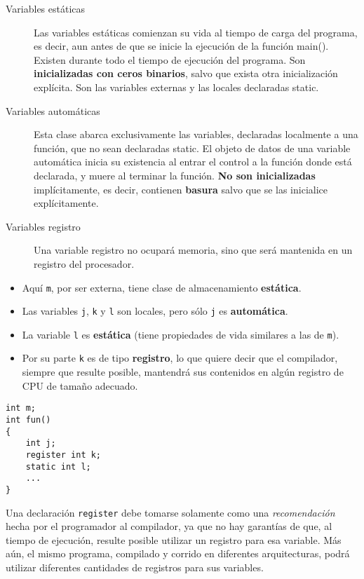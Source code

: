\begin{description}
	\item[Variables estáticas] Las variables estáticas comienzan su vida al tiempo de carga del programa, es decir, aun antes de que
se inicie la ejecución de la función main(). Existen durante todo el tiempo de ejecución del programa.
Son \textbf{inicializadas con ceros binarios}, salvo que exista otra inicialización explícita. Son las variables
externas y las locales declaradas static.
 \item [Variables automáticas] Esta clase abarca exclusivamente las variables, declaradas localmente a una función, que no sean
declaradas static. El objeto de datos de una variable automática inicia su existencia al entrar el control a la función donde
está declarada, y muere al terminar la función. \textbf{No son inicializadas} implícitamente, es decir, contienen
\textbf{basura} salvo que se las inicialice explícitamente.
\item [Variables registro] Una variable registro no ocupará memoria, sino que será mantenida en un registro del procesador.
\end{description}

\begin{ejemplo}
\noindent
\begin{itemize}
	\item Aquí \texttt{m}, por ser externa, tiene clase de almacenamiento \textbf{estática}. 
	\item Las variables \texttt{j}, \texttt{k} y \texttt{l} son locales, pero sólo \texttt{j} es \textbf{automática}. 
	\item La variable \texttt{l} es \textbf{estática} (tiene propiedades de vida similares a las de \texttt{m}). 
		\item Por su parte \texttt{k} es de tipo \textbf{registro}, lo que quiere decir que el compilador, siempre que resulte posible, mantendrá sus contenidos en algún registro de CPU de tamaño adecuado. 
\end{itemize}
\begin{lstlisting}
int m;
int fun()
{
	int j;
	register int k;
	static int l;
	...
}
\end{lstlisting}
\end{ejemplo}


Una declaración \texttt{register} debe tomarse solamente como una \textit{recomendación} hecha por el programador al compilador, ya que no hay garantías de que, al tiempo de ejecución, resulte posible utilizar un registro para esa variable. Más aún, el mismo programa, compilado y corrido en diferentes arquitecturas, podrá utilizar diferentes cantidades de registros para sus variables.

